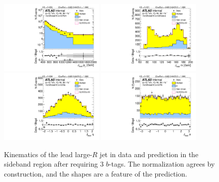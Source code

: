 \clearpage

\begin{figure}[htbp!]
\begin{center}
\includegraphics[angle=270, width=0.45\textwidth]{./figures/boosted/Sideband/b77_ThreeTag_Sideband_leadHCand_Pt_m_1.pdf}
\includegraphics[angle=270, width=0.45\textwidth]{./figures/boosted/Sideband/b77_ThreeTag_Sideband_leadHCand_Mass_s.pdf}\\
\includegraphics[angle=270, width=0.45\textwidth]{./figures/boosted/Sideband/b77_ThreeTag_Sideband_leadHCand_Eta.pdf}
\includegraphics[angle=270, width=0.45\textwidth]{./figures/boosted/Sideband/b77_ThreeTag_Sideband_leadHCand_Phi.pdf}
  \caption{Kinematics of the lead large-$R$ jet in data and prediction in the sideband region after requiring 3 $b$-tags. The normalization agrees by construction, and the shapes are a feature of the prediction.}
  \label{fig:boosted-3b-sideband-ak10-lead}
\end{center}
\end{figure}

